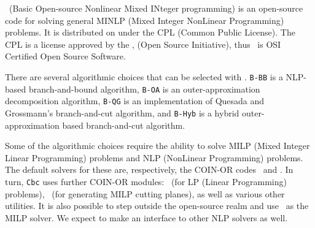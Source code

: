 
\begin{htmlonly}

\begin{PageSummary}
\end{PageSummary}


\begin{quickref}
\end{quickref}
\end{htmlonly}
\Bonmin\ (Basic Open-source Nonlinear Mixed INteger programming)
is an open-source code for solving general MINLP (Mixed
Integer NonLinear Programming) problems.
 It is distributed on
\COINOR
{}
under the CPL (Common Public
License). The CPL is a license approved by the
,
(Open Source Initiative),
 thus \Bonmin\ is OSI
Certified Open Source Software.

There are several algorithmic choices that can be selected with \Bonmin.
{\tt B-BB} is a NLP-based branch-and-bound algorithm,
{\tt B-OA} is an
outer-ap\-prox\-i\-ma\-tion decomposition algorithm, {\tt B-QG} is an
implementation of  Quesada and Grossmann's branch-and-cut algorithm,
and {\tt B-Hyb} is a hybrid outer-ap\-prox\-i\-ma\-tion based
branch-and-cut algorithm.


Some of the algorithmic choices require the ability to solve MILP
(Mixed Integer Linear Programming) problems and NLP (NonLinear
Programming) problems. The default solvers for these are,
respectively, the COIN-OR codes \Cbc\ and \Ipopt. In turn,
{\tt Cbc} uses further COIN-OR modules: \Clp\ (for LP (Linear
Programming) problems), \Cgl\ (for generating MILP cutting
planes), as well as various other utilities. It is also possible to
step outside the open-source realm and use
\Cplex\ as the MILP solver. We expect to make an interface to other NLP solvers as well.

